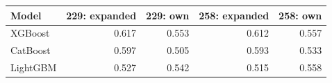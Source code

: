 \begin{center}\small
\begin{tabular}{@{}lrrrr@{}}\toprule
Model & 229: expanded & 229: own & 258: expanded & 258: own\\\midrule
XGBoost & 0.617 & 0.553 & 0.612 & 0.557\\
CatBoost & 0.597 & 0.505 & 0.593 & 0.533\\
LightGBM & 0.527 & 0.542 & 0.515 & 0.558\\
\bottomrule\end{tabular}\end{center}
